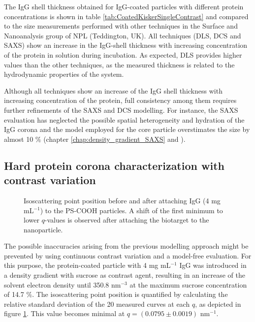 The IgG shell thickness obtained for IgG-coated particles with different protein concentrations is shown in table \ref{tab:CoatedKiskerSingleContrast} and compared to the size measurements performed with other techniques in the Surface and Nanoanalysis group of NPL (Teddington, UK). All techniques (DLS, DCS and SAXS) show an increase in the IgG-shell thickness with increasing concentration of the protein in solution during incubation. As expected, DLS provides higher values than the other techniques, as the measured thickness is related to the hydrodynamic properties of the system.

Although all techniques show an increase of the IgG shell thickness with increasing concentration of the protein, full consistency among them requires further refinements of the SAXS and DCS modelling. For instance, the SAXS evaluation has neglected the possible spatial heterogeneity and hydration of the IgG corona and the model employed for the core particle overstimates the size by almost 10 $\%$ (chapter \ref{chap:density_gradient_SAXS} and \cite{minelli_characterization_2014}).

\subsection{Hard protein corona characterization with contrast variation}
\label{sec:coated_kisker_continuous}

\begin{figure}
	\centering
		
		\caption[Isoscattering point position before and after attaching IgG.]{Isoscattering point position before and after attaching IgG (4 mg mL$^{-1}$) to the PS-COOH particles. A shift of the first minimum to lower $q$-values is observed after attaching the biotarget to the nanoparticle.}
		\label{fig:CoatedKiskerIsopointComp}
\end{figure}

The possible inaccuracies arising from the previous modelling approach might be prevented by using continuous contrast variation and a model-free evaluation. For this purpose, the protein-coated particle with 4 mg mL$^{-1}$ IgG was introduced in a density gradient with sucrose as contrast agent, resulting in an increase of the solvent electron density until 350.8 nm$^{-3}$ at the maximum sucrose concentration of 14.7 $\%$. The isoscattering point position is quantified by calculating the relative standard deviation of the 20 measured curves at each $q$, as depicted in figure \ref{fig:CoatedKiskerIsopointComp}. This value becomes minimal at $q = \left( 0.0795\pm0.0019 \right)$ nm$^{-1}$.

